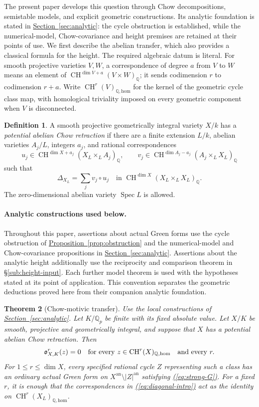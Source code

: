 \documentclass[11pt,a4paper]{article}
\newtheorem{theorem}{Theorem}[section]
\theoremstyle{definition}
\newtheorem{definition}[theorem]{Definition}
\theoremstyle{remark}\newtheorem{remark}[theorem]{Remark}
\numberwithin{equation}{section}
\newcommand{\Q}{\mathbb Q}\newcommand{\R}{\mathbb R}\newcommand{\C}{\mathbb C}
\newcommand{\CH}{\operatorname{CH}}\newcommand{\an}{\mathrm{an}}
\newcommand{\homol}{\mathrm{hom}}\newcommand{\BC}{\mathrm{BC}}
\newcommand{\Spec}{\operatorname{Spec}}\newcommand{\Bl}{\operatorname{Bl}}
\newcommand{\secref}[1]{\hyperref[#1]{\textcolor{sectionlink}{Section~\ref*{#1}}}}
\newcommand{\subref}[1]{\hyperref[#1]{\textcolor{sectionlink}{\S\ref*{#1}}}}
\newcommand{\propref}[1]{\hyperref[#1]{\textcolor{resultlink}{Proposition~\ref*{#1}}}}
\renewcommand{\eqref}[1]{\hyperref[#1]{\textcolor{equationlink}{(\ref*{#1})}}}
\begin{document}
The present paper develops this question through Chow decompositions,
semistable models, and explicit geometric constructions. Its analytic
foundation is stated in \secref{sec:analytic}: the cycle obstruction is
established, while the numerical-model, Chow-covariance and height
premises are retained at their points of use. We first describe the
abelian transfer, which also provides a classical formula for the height.
The required algebraic datum is literal.
For smooth projective varieties $V,W$, a correspondence of degree $a$ from
$V$ to $W$ means an element of
$\CH^{\dim V+a}(V\times W)_\Q$; it sends codimension $r$ to codimension
$r+a$. Write $\CH^r(V)_{\Q,\homol}$ for the kernel of the geometric
cycle class map, with homological triviality imposed on every geometric
component when $V$ is disconnected.

\begin{definition}\label{def:abelian-retraction}
A smooth projective geometrically integral variety $X/k$ has a
\emph{potential abelian Chow retraction} if there are a finite extension
$L/k$, abelian varieties $A_j/L$, integers $a_j$, and rational
correspondences
\[
 u_j\in\CH^{\dim X+a_j}(X_L\times_L A_j)_\Q,
 \qquad
 v_j\in\CH^{\dim A_j-a_j}(A_j\times_L X_L)_\Q
\]
such that
\begin{equation}\label{eq:diagonal-intro}
       \Delta_{X_L}=\sum_j v_j\circ u_j
       \quad\text{in }\CH^{\dim X}(X_L\times_L X_L)_\Q.
\end{equation}
The zero-dimensional abelian variety $\Spec L$ is allowed.
\end{definition}

\paragraph{Analytic constructions used below.}
Throughout this paper, assertions about actual Green forms use the
cycle obstruction of \propref{prop:obstruction} and the
numerical-model and Chow-covariance propositions in
\secref{sec:analytic}. Assertions about the analytic height additionally
use the reciprocity and comparison theorem in \subref{sub:height-input}.
Each further model theorem is used with the hypotheses stated at its point
of application. This convention separates the geometric deductions proved
here from their companion analytic foundation.

\begin{theorem}[Chow-motivic transfer]\label{thm:main}
Use the local constructions of \secref{sec:analytic}.
Let $K/\Q_p$ be finite with its fixed absolute value. Let $X/K$ be smooth,
projective and geometrically integral, and suppose that $X$ has a potential
abelian Chow retraction. Then
\[
 \ob^r_{X,K}(z)=0
 \quad\text{for every }z\in\CH^r(X)_{\Q,\homol}
 \quad\text{and every }r.
\]
For $1\le r\le\dim X$, every specified rational cycle $Z$ representing
such a class has an ordinary actual Green form on
$X^{\an}\setminus |Z|^{\an}$ satisfying \eqref{eq:strong-G}.
For a fixed $r$, it is enough that the correspondences in
\eqref{eq:diagonal-intro} act as the identity on
$\CH^r(X_L)_{\Q,\homol}$.
\end{theorem}
\end{document}
